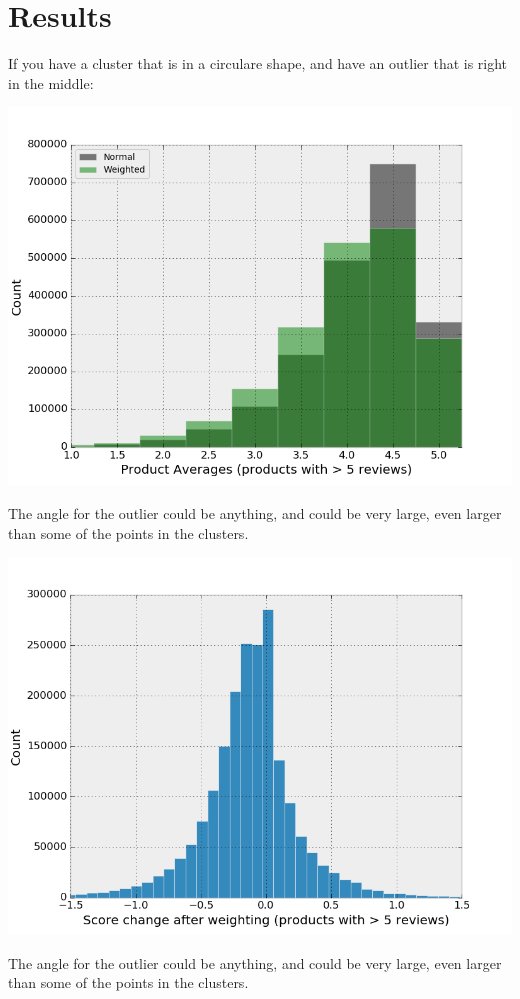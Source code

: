 \documentclass[a4paper,11pt]{article}
\begin{document}
\section*{Results}
If you have a cluster that is in a circulare shape, and have an outlier that is right in the middle:
\begin{center}
    \includegraphics[scale=0.65]{normascore_vs_regular.png}
\end{center}
The angle for the outlier could be anything, and could be very large, even larger than some of the points in the clusters.
\begin{center}
    \includegraphics[scale=0.65]{normascore_changes.png}
\end{center}
The angle for the outlier could be anything, and could be very large, even larger than some of the points in the clusters.
\end{document}
